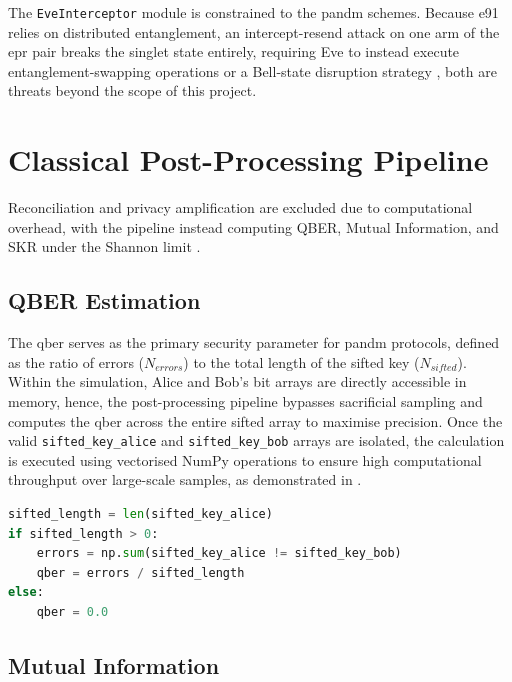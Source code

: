 \documentclass[11pt, a4paper]{report}
\begin{document}
The \texttt{EveInterceptor} module is constrained to the \gls{pandm} schemes. Because \gls{e91} relies on distributed \gls{entanglement}, an intercept-resend attack on one arm of the \gls{epr} pair breaks the singlet state entirely, requiring Eve to instead execute \gls{entanglement}-swapping operations or a Bell-state disruption strategy \cite{E91}, both are threats beyond the scope of this project.



\newpage
\section{Classical Post-Processing Pipeline}
\label{sec:postprocessing}

Reconciliation and privacy amplification are excluded due to computational overhead, with the pipeline instead computing QBER, Mutual Information, and SKR under the Shannon limit \cite{Shannon1948}.


\subsection{QBER Estimation}
\label{subsec:QBER}

The \gls{qber} serves as the primary security parameter for \gls{pandm} protocols, defined as the ratio of errors ($N_{errors}$) to the total length of the sifted key ($N_{sifted}$). Within the simulation, Alice and Bob's bit arrays are directly accessible in memory, hence, the post-processing pipeline bypasses sacrificial sampling and computes the \gls{qber} across the entire sifted array to maximise precision. Once the valid \texttt{sifted\_key\_alice} and \texttt{sifted\_key\_bob} arrays are isolated, the calculation is executed using vectorised NumPy operations to ensure high computational throughput over large-scale samples, as demonstrated in .

\begin{lstlisting}[language=Python, caption={Vectorised QBER Calculation Logic.}, label={lst:qber_calc}]
sifted_length = len(sifted_key_alice)
if sifted_length > 0:
    errors = np.sum(sifted_key_alice != sifted_key_bob)
    qber = errors / sifted_length
else:
    qber = 0.0
\end{lstlisting}

\subsection{Mutual Information}
\label{subsec:mutualinfo}
\end{document}
